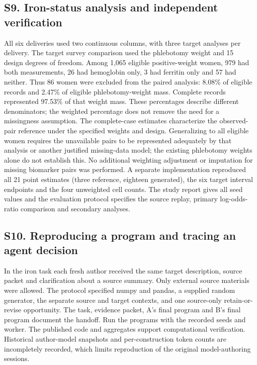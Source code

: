 \documentclass[11pt,letterpaper]{article}
\begin{document}
\subsection*{S9. Iron-status analysis and independent verification}

All six deliveries used two continuous columns, with three target analyses per delivery. The target survey comparison used the phlebotomy weight and 15 design degrees of freedom. Among 1,065 eligible positive-weight women, 979 had both measurements, 26 had hemoglobin only, 3 had ferritin only and 57 had neither. Thus 86 women were excluded from the paired analysis: 8.08\% of eligible records and 2.47\% of eligible phlebotomy-weight mass. Complete records represented 97.53\% of that weight mass. These percentages describe different denominators; the weighted percentage does not remove the need for a missingness assumption. The complete-case estimates characterize the observed-pair reference under the specified weights and design. Generalizing to all eligible women requires the unavailable pairs to be represented adequately by that analysis or another justified missing-data model; the existing phlebotomy weights alone do not establish this. No additional weighting adjustment or imputation for missing biomarker pairs was performed. A separate implementation reproduced all 21 point estimates (three reference, eighteen generated), the six target interval endpoints and the four unweighted cell counts. The study report gives all seed values and the evaluation protocol specifies the source replay, primary log-odds-ratio comparison and secondary analyses.


\subsection*{S10. Reproducing a program and tracing an agent decision}

In the iron task each fresh author received the same target description, source packet and clarification about a source summary. Only external source materials were allowed. The protocol specified numpy and pandas, a supplied random generator, the separate source and target contexts, and one source-only retain-or-revise opportunity. The task, evidence packet, A's final program and B's final program document the handoff. Run the programs with the recorded seeds and worker. The published code and aggregates support computational verification. Historical author-model snapshots and per-construction token counts are incompletely recorded, which limits reproduction of the original model-authoring sessions.
\end{document}

